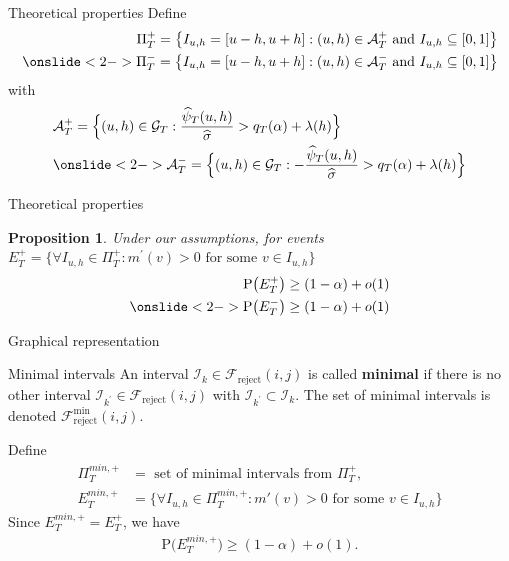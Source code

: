 \documentclass[10pt]{beamer}
\newcommand{\Prob}{\mathrm{P}}
\newtheorem{prop}{Proposition}
\begin{document}
\begin{frame}{Theoretical properties}
Define
\begin{align*}
\Pi_T^+ = \big\{ I_{u,h} = [u-h,u+h]: (u,h) \in \mathcal{A}_T^+ \text{ and } I_{u, h} \subseteq [0,1] \big\}\\
\onslide<2->{\Pi_T^- = \big\{ I_{u,h} = [u-h,u+h]: (u,h) \in \mathcal{A}_T^- \text{ and } I_{u, h} \subseteq [0,1] \big\}}
\end{align*}
\vspace{-5mm}
with
\begin{align*} 
&\mathcal{A}_T^+ = \Big\{ (u,h) \in \mathcal{G}_T: \frac{\widehat{\psi}_T(u,h)}{\widehat{\sigma}} > q_T(\alpha)  + \lambda(h)  \Big\}\\
&\onslide<2->{\mathcal{A}_T^- = \Big\{ (u,h) \in \mathcal{G}_T: -\frac{\widehat{\psi}_T(u,h)}{\widehat{\sigma}} > q_T(\alpha)  + \lambda(h)  \Big\}}
\end{align*}
\end{frame}

\begin{frame}{Theoretical properties}
\begin{prop}\label{prop-shape-3}
Under our assumptions, for events $E_T^+ = \Big\{ \forall I_{u,h} \in \Pi_T^+: m^{\prime}(v) > 0 \text{ for some } v \in I_{u,h}\Big\}$
\begin{align*}
\Prob \big( E_T^+ \big) \ge (1-\alpha) + o(1)\\
\onslide<2->{\Prob \big( E_T^- \big) \ge (1-\alpha) + o(1)}
\end{align*} 
\end{prop}
\end{frame}

\begin{frame}{Graphical representation}
\begin{block}{Minimal intervals}
An interval $\mathcal{I}_k \in \mathcal{F}_{\text{reject}}(i, j)$ is called \textbf{minimal} if there is no other interval $\mathcal{I}_{k^\prime} \in \mathcal{F}_{\text{reject}}(i, j)$ with $\mathcal{I}_{k^\prime} \subset \mathcal{I}_k$. The set of minimal intervals is denoted $\mathcal{F}_{\text{reject}}^{\min} (i, j)$.
\end{block}\pause
Define
\begin{align*}
\Pi^{min, +}_T &= \text{ set of minimal intervals from }\Pi^+_T,\\
E_T^{min, +} &= \Big\{ \forall I_{u,h} \in \Pi_T^{min, +}: m'(v) > 0 \text{ for some } v \in I_{u,h}\Big\}
\end{align*}\pause
Since $E_T^{min, +} = E_T^{+}$, we have
\begin{align*}
\Prob \big( E_T^{min, +} \big) \ge (1-\alpha) + o(1).
\end{align*}
\end{frame}
\end{document}
